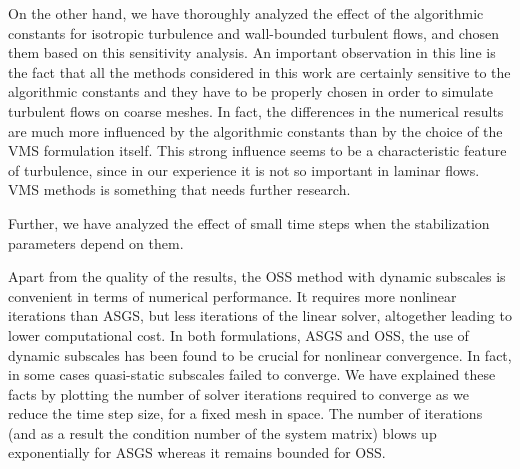 On the other hand, we have thoroughly analyzed the effect of the algorithmic constants for isotropic turbulence and wall-bounded turbulent flows, and chosen them based on this sensitivity analysis. An important observation in this line is the fact that all the methods considered in this work are certainly sensitive to the algorithmic constants and they have to be properly chosen in order to simulate turbulent flows on coarse meshes. In fact, the differences in the numerical results are much more influenced by the algorithmic constants than by the choice of the VMS formulation itself.  This strong influence seems to be a characteristic feature of turbulence, since in our experience it is not so important in laminar flows. VMS methods is something that needs further research.

Further, we have analyzed the effect of small time steps when the stabilization parameters depend on them.


Apart from the quality of the results, the OSS method with dynamic subscales is convenient in terms of numerical performance. It requires more nonlinear iterations than ASGS, but less iterations of the linear solver, altogether leading to lower computational cost. In both formulations, ASGS and OSS, the use of dynamic subscales has been found to be crucial for nonlinear convergence. In fact, in some cases quasi-static subscales failed to converge. We have explained these facts by plotting the number of solver iterations required to converge as we reduce the time step size, for a fixed mesh in space. The number of iterations (and as a result the condition number of the system matrix) blows up exponentially for ASGS whereas it remains bounded for OSS.